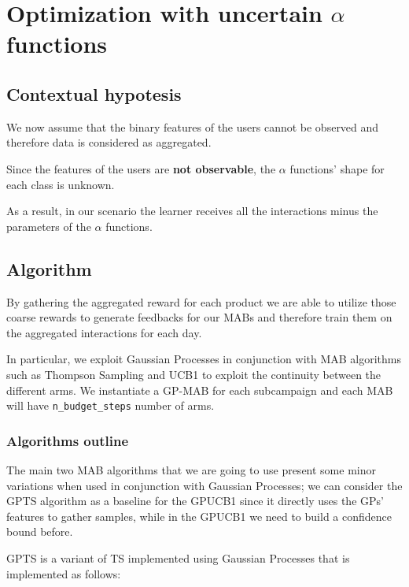 \chapter{Optimization with uncertain \texorpdfstring{$\alpha$}{alpha} functions}
\label{chap:unc_alpha}

\section{Contextual hypotesis}
\label{sec:unc_a_hyp}

We now assume that the binary features of the users cannot be observed and therefore data is considered as aggregated.

Since the features of the users are \textbf{not observable}, the $\alpha$ functions' shape for each class is unknown.

As a result, in our scenario the learner receives all the interactions minus the parameters of the $\alpha$ functions.

\section{Algorithm}
\label{sec:unc_a_alg}

By gathering the aggregated reward for each product we are able to utilize those coarse rewards to generate feedbacks for our MABs and therefore train them on the aggregated interactions for each day.

In particular, we exploit Gaussian Processes in conjunction with MAB algorithms such as Thompson Sampling and UCB1 to exploit the continuity between the different arms.
We instantiate a GP-MAB for each subcampaign and each MAB will have \texttt{n\_budget\_steps} number of arms.

\subsection{Algorithms outline}

The main two MAB algorithms that we are going to use present some minor variations when used in conjunction with Gaussian Processes; we can consider the GPTS algorithm as a baseline for the GPUCB1 since it directly uses the GPs' features to gather samples, while in the GPUCB1 we need to build a confidence bound before.

GPTS is a variant of TS implemented using Gaussian Processes that is implemented as follows:

